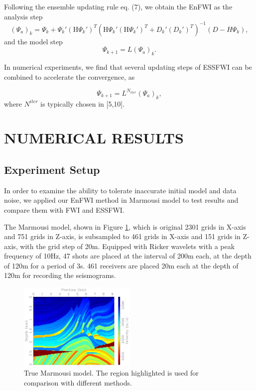 \documentclass[mreferee]{gji}
\begin{document}
Following the ensemble updating rule eq. (7), we obtain the EnFWI as the analysis step
\begin{equation}
(\Psi_a)_k=\Psi_k+\Psi_k'(\mbox{H}\Psi_k')^T\left(\mbox{H}\Psi_k'(\mbox{H}\Psi_k')^T+D_k'(D_k')^T\right)^{-1}(D-H\Psi_k),
\end{equation}
and the model step
\begin{equation}
\Psi_{k+1}=L(\Psi_a)_k.
\end{equation}

In numerical experiments, we find that several updating steps of ESSFWI can be combined to accelerate the convergence, as

\begin{equation}
\Psi_{k+1}=L^{N_{iter}}(\Psi_a)_k,
\end{equation}
where $N^{iter}$ is typically chosen in [5,10].

\section{NUMERICAL RESULTS}
\subsection{Experiment Setup}
In order to examine the ability to tolerate inaccurate initial model and data noise, we applied our EnFWI method in Marmousi model to test results and compare them with FWI and ESSFWI.

The Marmousi model, shown in Figure \ref{fig:marmousi}, which is original 2301 grids in X-axis and 751 grids in Z-axis, is subsampled to 461 grids in X-axis and 151 grids in Z-axis, with the grid step of 20m. Equipped with Ricker wavelets with a peak frequency of 10Hz, 47 shots are placed at the interval of 200m each, at the depth of 120m for a period of 3s. 461 receivers are placed 20m each at the depth of 120m for recording the seismograms.

\begin{figure}
\center
\includegraphics[width=0.5\textwidth]{fig/marmvel.pdf}
\caption{True Marmousi model. The region highlighted is used for comparison with different methods.}
\label{fig:marmousi}
\end{figure}
\end{document}
